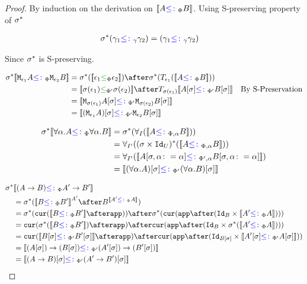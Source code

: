 \documentclass{report}
\begin{document}
\begin{framed}
    \begin{proof}
        
        By induction on the derivation on ${\bf [\![}A{\color{blue} \leq\colon}_\Phi B{\bf ]\!]}$. Using S-preserving property of $\sigma^*$ 
        
        \case{\sground}
        \begin{align*}
            \sigma^*(\gamma_1{\color{blue} \leq\colon}_\gamma\gamma_2) &= (\gamma_1{\color{blue} \leq\colon}_\gamma\gamma_2)
        \end{align*}
        
        Since $\sigma^*$ is S-preserving.
        
        \case{\seffect}
        \begin{align*}
            \si\star\deno{\M{\e_1}{A} \subtypep \M{\e_2}{B}} & = \si\star(\deno{\e_1\subeffectp\e_2})\after\si\star(\T{\e_1}(\deno{A\subtypep B})) \\ 
             &= \deno{\si(\e_1)\subeffectpp\si(\e_2)} \after \T{\si(\e_1)}{\deno{A\ssi\subtypepp B\ssi}}\qt{By S-Preservation}\\
             &= \deno{\M{\si(\e_1)}{A\ssi}\subtypepp\M{\si(\e_2)}{B\ssi}}\\
             &= \deno{(\M{\e_1}{A})\ssi\subtypepp\M{\e_2}{B}\ssi}\\
        \end{align*}
        
        \case{\squant}
            \begin{align*}
                \si\star\deno{\all{\a}{A}\subtypep\all{\a}{B}} &= \si\star(\allI(\deno{A\subtypepa B})) \\
                &=\allII((\si\times\Id{U})\star(\deno{A\subtypepa B}))\\
                &=\allII(\deno{A\sub{\si,\a\setto\a}\subtypeppa B\sub{\si,\a\setto\a}})\\
                &= \deno{(\all{\a}{A})\ssi \subtypepp(\all{\a}{B})\ssi}\\
            \end{align*}
        
        \case{\sfun}
        
        \begin{align*}
            \si\star&\deno{(\ab)\subtypep\fntype{A'}{B'}} \\
             &= \si\star(\deno{B\subtypep B'}^{A'}\after B^{\deno{A'\subtypep A}})\\
            &= \si\star(\cur{\deno{B\subtypep B'}\after\app})\after\si\star(\cur{\app\after(\Id{B}\times\deno{A'\subtypep A})})\\
            & = \cur{\si\star(\deno{B\subtypep B'})\after\app}\after\cur{\app\after(\Id{B}\times\si\star(\deno{A'\subtypep A}))}\\
            & = \cur{\deno{B\ssi\subtypepp B'\ssi}\after\app}\after\cur{\app\after(\Id{B\ssi}\times\deno{A'\ssi\subtypepp A\ssi})}\\
            &= \deno{\fntype{(A\ssi)}{(B\ssi)}\subtypepp\fntype{(A'\ssi)}{(B'\ssi)}}\\
            &= \deno{(\ab)\ssi\subtypepp(\fntype{A'}{B'})\ssi}
        \end{align*}
        

\end{proof}
\end{framed}
\end{document}
